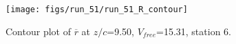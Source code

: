 \begin{figure}[H]
\centering
\texttt{[image: figs/run\_51/run\_51\_R\_contour]}
\caption{Contour plot of $\overline{r}$ at $z/c$=9.50, $V_{free}$=15.31, station 6.}
\label{fig:run_51_R_contour}
\end{figure}


